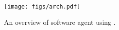\begin{figure}
    \centering
     \texttt{[image: figs/arch.pdf]}
    \caption{An overview of software agent using \sys.}
    \label{fig:overview}
\end{figure}